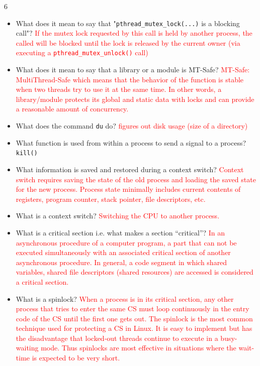 \documentclass[9pt,landscape]{memoir}
\newcommand{\answer}[1]{\textcolor{red}{#1}}
\begin{document}
\begin{multicols}{6}
\begin{itemize}
    \item What does it mean to say that "\verb$pthread_mutex_lock(...)$ is a blocking call"?  \answer{If the mutex lock requested by this call is held by another process, the called will be blocked until the lock is released by the current owner (via executing a \texttt{pthread\_mutex\_unlock()} call)}
    \item What does it mean to say that a library or a module is MT-Safe? \answer{MT-Safe: MultiThread-Safe which means that the behavior of the function is stable when two threads try to use it at the same time. In other words, a library/module protects its global and static data with locks and can provide a reasonable amount of concurrency.}
    \item  What does the command \verb$du$ do? \answer{figures out disk usage (size of a directory)}
    \item What function is used from within a process to send a signal to a process? \verb$kill()$
    \item What information is saved and restored during a context switch? \answer{Context switch requires saving the state of the old process and loading the saved state for the new process. Process state minimally includes current contents of registers, program counter, stack pointer, file descriptors, etc.}
    \item What is a context switch? \answer{Switching the CPU to another process.}
    \item What is a critical section i.e. what makes a section ``critical''? \answer{In an asynchronous procedure of a computer program, a part that can not be executed simultaneously with an associated critical section of another asynchronous procedure. In general, a code segment in which shared variables, shared file descriptors (shared resources) are accessed is considered a critical section.}
    \item What is a spinlock? \answer{When a process is in its critical section, any other process that tries to enter the same CS must loop continuously in the entry code of the CS until the first one gets out. The spinlock is the most common technique used for protecting a CS in Linux. It is easy to implement but has the disadvantage that locked-out threads continue to execute in a busy-waiting mode. Thus spinlocks are most effective in situations where the wait-time is expected to be very short.}
\end{itemize}


\end{multicols}
\end{document}
